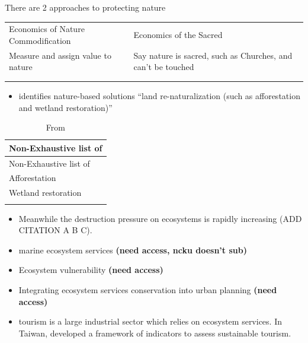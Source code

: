 \documentclass[
  letterpaper,
  DIV=11,
  numbers=noendperiod]{scrartcl}
\providecommand{\tightlist}{%
  \setlength{\itemsep}{0pt}\setlength{\parskip}{0pt}}\usepackage{longtable,booktabs,array}
\begin{document}
There are 2 approaches to protecting nature

\begin{longtable}[]{@{}
  >{\raggedright\arraybackslash}p{}
  >{\raggedright\arraybackslash}p{}@{}}
\toprule\noalign{}
\endhead
\bottomrule\noalign{}
\endlastfoot
Economics of Nature Commodification & Economics of the Sacred \\
Measure and assign value to nature & Say nature is sacred, such as
Churches, and can't be touched
\citep{eisensteinSacredEconomicsMoney2011, eisensteinClimateNewStory2018} \\
& \\
& \\
\end{longtable}

\begin{itemize}
\tightlist
\item
  \citet{hanEmbeddingNaturebasedSolutions2022} identifies nature-based
  solutions ``land re-naturalization (such as afforestation and wetland
  restoration)''
\end{itemize}

\begin{longtable}[]{@{}l@{}}
\caption{From
\citet{hanEmbeddingNaturebasedSolutions2022}}\tabularnewline
\toprule\noalign{}
Non-Exhaustive list of \\
\midrule\noalign{}
\endfirsthead
\toprule\noalign{}
Non-Exhaustive list of \\
\midrule\noalign{}
\endhead
\bottomrule\noalign{}
\endlastfoot
Afforestation \\
Wetland restoration \\
 \\
\end{longtable}

\begin{itemize}
\item
  Meanwhile the destruction pressure on ecosystems is rapidly increasing
  (ADD CITATION A B C).
\item
  \citet{espinosaImpactsEvolutionChanges2023} marine ecosystem services
  \textbf{(need access, ncku doesn't sub)}
\item
  \citet{chenResponseEcosystemVulnerability2023} Ecosystem vulnerability
  \textbf{(need access)}
\item
  \citet{zhangIntegratingEcosystemServices2023} Integrating ecosystem
  services conservation into urban planning \textbf{(need access)}
\item
  \citet{liDistinguishingImpactTourism2023} tourism is a large
  industrial sector which relies on ecosystem services. In Taiwan,
  \citep{leeDevelopingIndicatorFramework2021} developed a framework of
  indicators to assess sustainable tourism.
\end{itemize}
\end{document}
